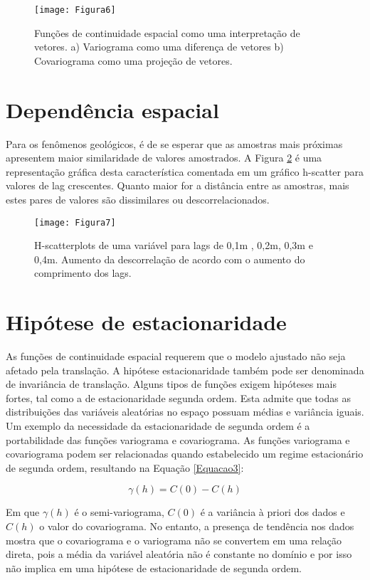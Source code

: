 \begin{figure}[!]
	\centering
	\texttt{[image: Figura6]}
	\caption{Funções de continuidade espacial como uma interpretação de vetores. a) Variograma como uma diferença de vetores b) Covariograma como uma projeção de vetores.}
	\label{Figura6}
\end{figure}

\section{Dependência espacial}

Para os fenômenos geológicos, é de se esperar que as amostras mais próximas apresentem maior similaridade de valores amostrados. A Figura \ref{Figura7} é uma representação gráfica desta característica comentada em um gráfico h-scatter para valores de lag crescentes. Quanto maior for a distância entre as amostras, mais estes pares de valores são dissimilares ou descorrelacionados.  

\begin{figure}[!]
	\centering
	\texttt{[image: Figura7]}
	\caption{H-scatterplots de uma variável para lags de 0,1m , 0,2m, 0,3m e 0,4m. Aumento da descorrelação de acordo com o aumento do comprimento dos lags.}
	\label{Figura7}
\end{figure}

\section{Hipótese de estacionaridade}

As funções de continuidade espacial requerem que o modelo ajustado não seja afetado pela translação. A hipótese estacionaridade também pode ser denominada de invariância de translação. Alguns tipos de funções exigem hipóteses mais fortes, tal como a de estacionaridade segunda ordem. Esta admite que todas as distribuições das variáveis aleatórias no espaço possuam médias e variância iguais. 
Um exemplo da necessidade da estacionaridade de segunda ordem é a portabilidade das funções variograma e covariograma. As funções variograma e covariograma podem ser relacionadas quando estabelecido um regime estacionário de segunda ordem, resultando na Equação \ref{Equacao3}:

\begin{equation}\label{Equacao3}
\gamma(h) = C(0) - C(h)
\end{equation}

Em que $\gamma(h)$ é o semi-variograma, $C(0)$ é a variância à priori dos dados e $C(h)$ o valor do covariograma.  No entanto, a presença de tendência nos dados mostra que o covariograma e o variograma não se convertem em uma relação direta, pois a média da variável aleatória não é constante no domínio e por isso não implica em uma hipótese de estacionaridade de segunda ordem. 

